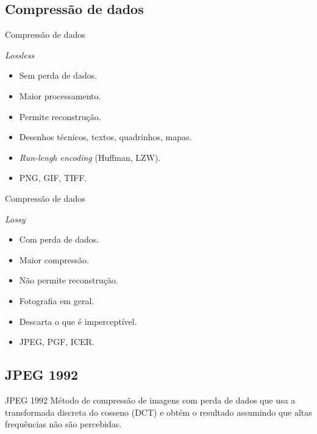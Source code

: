 \documentclass{beamer}
\begin{document}
\subsection{Compressão de dados}
\begin{frame}{Compressão de dados}
   \begin{block}{\textit{Lossless}}
      \begin{itemize}
         \item Sem perda de dados.
         \item Maior processamento.
         \item Permite reconstrução.
         \item Desenhos técnicos, textos, quadrinhos, mapas.
         \item \emph{Run-lengh encoding} (Huffman, LZW).
         \item PNG, GIF, TIFF.
      \end{itemize}
   \end{block}
\end{frame}
\begin{frame}{Compressão de dados}
   \begin{block}{\textit{Lossy}}
      \begin{itemize}
         \item Com perda de dados.
         \item Maior compressão.
         \item Não permite reconstrução.
         \item Fotografia em geral.
         \item Descarta o que é imperceptível.
         \item JPEG, PGF, ICER.
      \end{itemize}
   \end{block}
\end{frame}
\subsection{JPEG 1992}
\begin{frame}{JPEG 1992}
   Método de compressão de imagens com perda de dados que usa a transformada discreta do cosseno (DCT) e obtém o resultado assumindo que altas frequências não são percebidas.
\end{frame}
\end{document}
